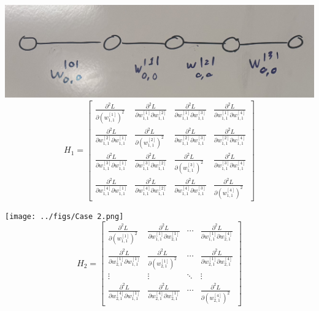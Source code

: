 \documentclass{article}
\begin{document}
\includegraphics[scale=0.1]{../figs/Case 1.png} \\[0.5cm]
\[
H_1 = \begin{bmatrix}
\frac{\partial^2 L}{\partial (w_{1,1}^{[1]})^2} & \frac{\partial^2 L}{\partial w_{1,1}^{[1]} \partial w_{1,1}^{[2]}} & \frac{\partial^2 L}{\partial w_{1,1}^{[1]} \partial w_{1,1}^{[3]}} & \frac{\partial^2 L}{\partial w_{1,1}^{[1]} \partial w_{1,1}^{[4]}} \\
\frac{\partial^2 L}{\partial w_{1,1}^{[2]} \partial w_{1,1}^{[1]}} & \frac{\partial^2 L}{\partial (w_{1,1}^{[2]})^2} & \frac{\partial^2 L}{\partial w_{1,1}^{[2]} \partial w_{1,1}^{[3]}} & \frac{\partial^2 L}{\partial w_{1,1}^{[2]} \partial w_{1,1}^{[4]}} \\
\frac{\partial^2 L}{\partial w_{1,1}^{[3]} \partial w_{1,1}^{[1]}} & \frac{\partial^2 L}{\partial w_{1,1}^{[3]} \partial w_{1,1}^{[2]}} & \frac{\partial^2 L}{\partial (w_{1,1}^{[3]})^2} & \frac{\partial^2 L}{\partial w_{1,1}^{[3]} \partial w_{1,1}^{[4]}} \\
\frac{\partial^2 L}{\partial w_{1,1}^{[4]} \partial w_{1,1}^{[1]}} & \frac{\partial^2 L}{\partial w_{1,1}^{[4]} \partial w_{1,1}^{[2]}} & \frac{\partial^2 L}{\partial w_{1,1}^{[4]} \partial w_{1,1}^{[3]}} & \frac{\partial^2 L}{\partial (w_{1,1}^{[4]})^2}
\end{bmatrix}
\]

\texttt{[image: ../figs/Case 2.png]} \\[0.5cm]

\[
H_2 = \begin{bmatrix}
\frac{\partial^2 L}{\partial (w_{1,1}^{[1]})^2} & \frac{\partial^2 L}{\partial w_{1,1}^{[1]} \partial w_{2,1}^{[1]}} & \cdots & \frac{\partial^2 L}{\partial w_{1,1}^{[1]} \partial w_{2,1}^{[4]}} \\
\frac{\partial^2 L}{\partial w_{2,1}^{[1]} \partial w_{1,1}^{[1]}} & \frac{\partial^2 L}{\partial (w_{2,1}^{[1]})^2} & \cdots & \frac{\partial^2 L}{\partial w_{2,1}^{[1]} \partial w_{2,1}^{[4]}} \\
\vdots & \vdots & \ddots & \vdots \\
\frac{\partial^2 L}{\partial w_{2,1}^{[4]} \partial w_{1,1}^{[1]}} & \frac{\partial^2 L}{\partial w_{2,1}^{[4]} \partial w_{2,1}^{[1]}} & \cdots & \frac{\partial^2 L}{\partial (w_{2,1}^{[4]})^2}
\end{bmatrix}
\]
\end{document}
